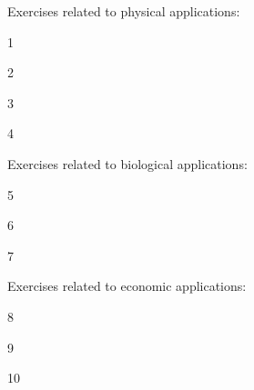 \begin{exercises}

\noindent Exercises related to physical applications:

\begin{exercise}
1
\begin{answer}
\end{answer}
\end{exercise}

\begin{exercise}
2
\begin{answer}
\end{answer}
\end{exercise}

\begin{exercise}
3
\begin{answer}
\end{answer}
\end{exercise}

\begin{exercise}
4
\begin{answer}
\end{answer}
\end{exercise}

\noindent Exercises related to biological applications:

\begin{exercise}
5
\begin{answer}
\end{answer}
\end{exercise}

\begin{exercise}
6
\begin{answer}
\end{answer}
\end{exercise}

\begin{exercise}
7
\begin{answer}
\end{answer}
\end{exercise}


\noindent Exercises related to economic applications:

\begin{exercise}
8
\begin{answer}
\end{answer}
\end{exercise}

\begin{exercise}
9
\begin{answer}
\end{answer}
\end{exercise}

\begin{exercise}
10
\begin{answer}
\end{answer}
\end{exercise}

\end{exercises}







